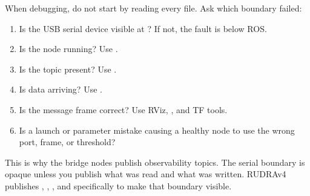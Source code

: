 When debugging, do not start by reading every file. Ask which boundary failed:

\begin{enumerate}
  \item Is the USB serial device visible at ? If not, the fault is below ROS.
  \item Is the node running? Use .
  \item Is the topic present? Use .
  \item Is data arriving? Use .
  \item Is the message frame correct? Use RViz, , and TF tools.
  \item Is a launch or parameter mistake causing a healthy node to use the wrong port, frame, or threshold?
\end{enumerate}

This is why the bridge nodes publish observability topics. The serial boundary is opaque unless you publish what was read and what was written. RUDRAv4 publishes , , , and  specifically to make that boundary visible.
